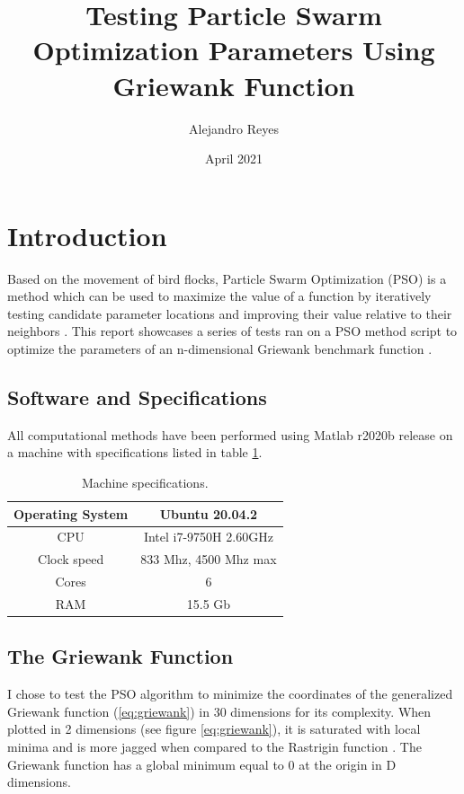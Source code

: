 \documentclass{article}
\title{Testing Particle Swarm Optimization Parameters Using Griewank Function}
\author{Alejandro Reyes}
\affil{\it{University of Texas Rio Grande Valley}\\ \it{Statistical Methods PHYS 5394}}
\date{April 2021}
\begin{document}
\maketitle

\section{Introduction}
Based on the movement of bird flocks, Particle Swarm Optimization (PSO) is a method which can be used to maximize the value of a function by iteratively testing candidate parameter locations and improving their value relative to their neighbors \cite{wiki:pso}.
This report showcases a series of tests ran on a PSO method script \cite{git:sdm} to optimize the parameters of an n-dimensional Griewank benchmark function \cite{ieee:standard}.

\subsection{Software and Specifications}
All computational methods have been performed using Matlab r2020b release on a machine with specifications listed in table \ref{table:specs}.

\begin{table}[h]
\centering
\begin{tabular}{ | c | c | }
\hline
     Operating System & Ubuntu 20.04.2 \\
\hline
     CPU & Intel i7-9750H 2.60GHz \\
\hline
     Clock speed & 833 Mhz, 4500 Mhz max \\
\hline
     Cores & 6 \\
\hline
     RAM & 15.5 Gb \\
\hline
\end{tabular}
\caption{Machine specifications.}
\label{table:specs}
\end{table}

\subsection{The Griewank Function}

I chose to test the PSO algorithm to minimize the coordinates of the generalized Griewank function (\ref{eq:griewank}) in 30 dimensions for its complexity.
When plotted in 2 dimensions (see figure \ref{eq:griewank}), it is saturated with local minima and is more jagged when compared to the Rastrigin function \cite{ieee:standard}.
The Griewank function has a global minimum equal to 0 at the origin in D dimensions.
\end{document}
